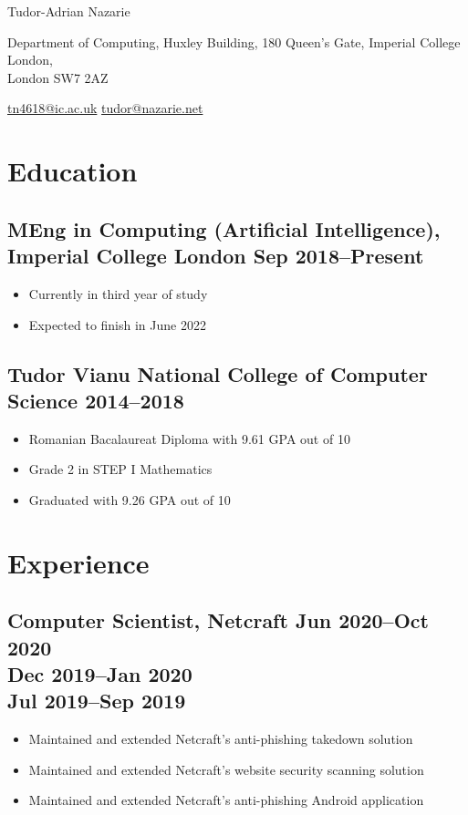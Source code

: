 \documentclass[a4paper]{article}
\begin{document}
\begin{center}
	{\huge\sffamily Tudor-Adrian Nazarie}

	\vspace{4pt}

	Department of Computing, Huxley Building, 180 Queen's Gate, Imperial
	College London,\\ London SW7 2AZ

	\vspace{4pt}

	\href{mailto:tn4618@ic.ac.uk}{tn4618@ic.ac.uk}
	\href{mailto:tudor@nazarie.net}{tudor@nazarie.net}


	\vspace{-12pt}
\end{center}

\section*{Education}
\subsection*{MEng in Computing (Artificial Intelligence), Imperial College
	London \hfill Sep 2018--Present}
\begin{itemize}
	\item Currently in third year of study
	\item Expected to finish in June 2022
\end{itemize}

\subsection*{Tudor Vianu National College of Computer Science \hfill 2014--2018}
\begin{itemize}
	\item Romanian Bacalaureat Diploma with 9.61 GPA out of 10
	\item Grade 2 in STEP I Mathematics
	\item Graduated with 9.26 GPA out of 10
\end{itemize}

\section*{Experience}
\subsection*{Computer Scientist, Netcraft
	\hfill Jun 2020--Oct 2020 \\
	\hfill Dec 2019--Jan 2020 \\
	\hfill Jul 2019--Sep 2019}
\begin{itemize}
	\item Maintained and extended Netcraft's anti-phishing takedown solution
	\item Maintained and extended Netcraft's website security scanning solution\
	\item Maintained and extended Netcraft's anti-phishing Android application
\end{itemize}
\end{document}
